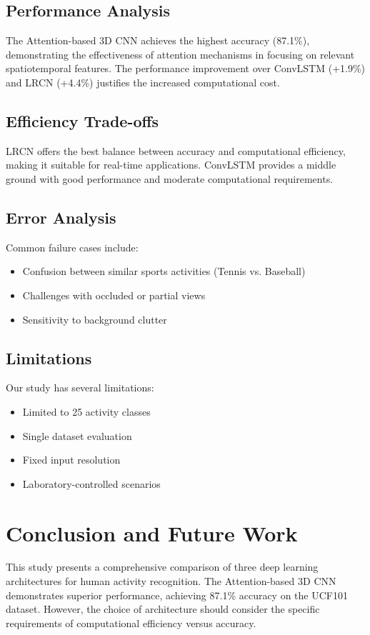 \documentclass[twocolumn]{article}
\begin{document}
\subsection{Performance Analysis}
The Attention-based 3D CNN achieves the highest accuracy (87.1\%), demonstrating the effectiveness of attention mechanisms in focusing on relevant spatiotemporal features. The performance improvement over ConvLSTM (+1.9\%) and LRCN (+4.4\%) justifies the increased computational cost.

\subsection{Efficiency Trade-offs}
LRCN offers the best balance between accuracy and computational efficiency, making it suitable for real-time applications. ConvLSTM provides a middle ground with good performance and moderate computational requirements.

\subsection{Error Analysis}
Common failure cases include:
\begin{itemize}
    \item Confusion between similar sports activities (Tennis vs. Baseball)
    \item Challenges with occluded or partial views
    \item Sensitivity to background clutter
\end{itemize}

\subsection{Limitations}
Our study has several limitations:
\begin{itemize}
    \item Limited to 25 activity classes
    \item Single dataset evaluation
    \item Fixed input resolution
    \item Laboratory-controlled scenarios
\end{itemize}

\section{Conclusion and Future Work}

This study presents a comprehensive comparison of three deep learning architectures for human activity recognition. The Attention-based 3D CNN demonstrates superior performance, achieving 87.1\% accuracy on the UCF101 dataset. However, the choice of architecture should consider the specific requirements of computational efficiency versus accuracy.
\end{document}
